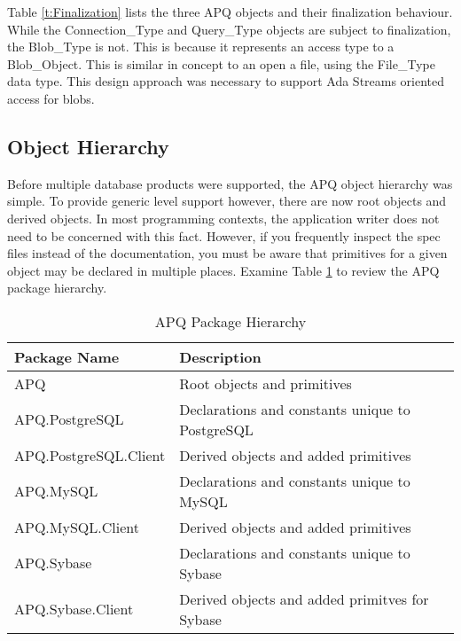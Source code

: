 \documentclass[english,letterpaper]{book}
\begin{document}
Table \ref{t:Finalization} lists the three APQ objects and their finalization
behaviour.
While the Connection\_Type
and Query\_Type objects are subject to
finalization, the Blob\_Type is not.
This is because it represents an access type to
a Blob\_Object. This is similar in concept to an open a file, using
the File\_Type data type. This design approach was necessary
to support Ada Streams oriented access for blobs.

\subsection{Object Hierarchy}

Before multiple database products were supported, the APQ object hierarchy
was simple. To provide generic level support however, there are now
root objects and derived objects. In most programming
contexts, the application writer does not need to be concerned with this fact.
However, if you frequently inspect the spec files instead of the documentation,
you must be aware that primitives for a given object may be declared
in multiple places. Examine Table \ref{t:pkghier} to review the APQ package hierarchy.

\begin{table}
   \begin{center}
      \begin{tabular}{ll}
         Package Name            & Description \\
         \hline 
         APQ                     & Root objects and primitives \\
         APQ.PostgreSQL          & Declarations and constants unique to PostgreSQL \\
         APQ.PostgreSQL.Client   & Derived objects and added primitives \\
         APQ.MySQL               & Declarations and constants unique to MySQL \\
         APQ.MySQL.Client        & Derived objects and added primitives \\
         APQ.Sybase              & Declarations and constants unique to Sybase \\
         APQ.Sybase.Client       & Derived objects and added primitves for Sybase \\
      \end{tabular}
   \end{center}
   \caption{APQ Package Hierarchy}\label{t:pkghier}
\end{table}
\end{document}
